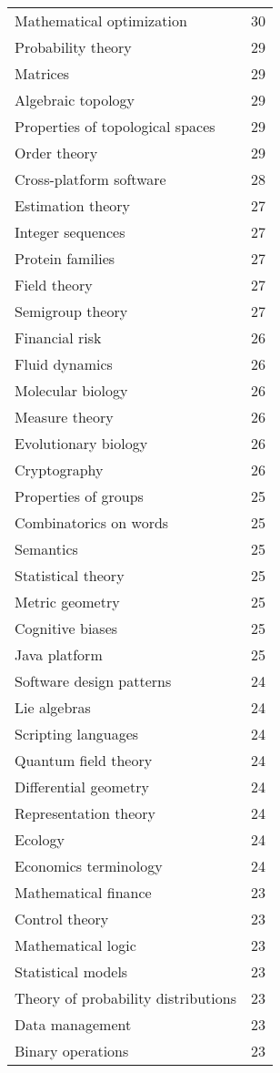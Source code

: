 \begin{appendices}
\begin{longtable} {|| p{20em} | p{5em} ||}
Mathematical optimization	&	30	\\
Probability theory	&	29	\\
Matrices	&	29	\\
Algebraic topology	&	29	\\
Properties of topological spaces	&	29	\\
Order theory	&	29	\\
Cross-platform software	&	28	\\
Estimation theory	&	27	\\
Integer sequences	&	27	\\
Protein families	&	27	\\
Field theory	&	27	\\
Semigroup theory	&	27	\\
Financial risk	&	26	\\
Fluid dynamics	&	26	\\
Molecular biology	&	26	\\
Measure theory	&	26	\\
Evolutionary biology	&	26	\\
Cryptography	&	26	\\
Properties of groups	&	25	\\
Combinatorics on words	&	25	\\
Semantics	&	25	\\
Statistical theory	&	25	\\
Metric geometry	&	25	\\
Cognitive biases	&	25	\\
Java platform	&	25	\\
Software design patterns	&	24	\\
Lie algebras	&	24	\\
Scripting languages	&	24	\\
Quantum field theory	&	24	\\
Differential geometry	&	24	\\
Representation theory	&	24	\\
Ecology	&	24	\\
Economics terminology	&	24	\\
Mathematical finance	&	23	\\
Control theory	&	23	\\
Mathematical logic	&	23	\\
Statistical models	&	23	\\
Theory of probability distributions	&	23	\\
Data management	&	23	\\
Binary operations	&	23	\\

\end{longtable}
\end{appendices}
